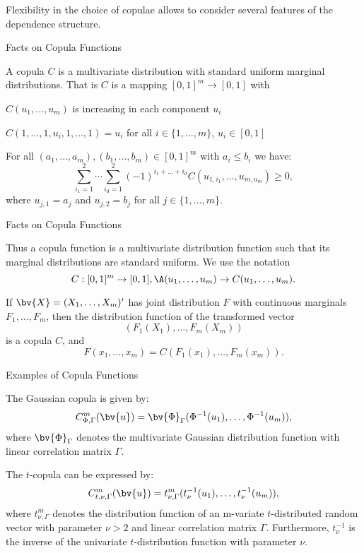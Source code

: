 Flexibility in the choice of copulae allows to consider several
features of the dependence
structure.

{Facts on Copula Functions}

A copula $C$ is a multivariate distribution with standard uniform
marginal distributions. That is $C$ is a mapping $[0,1]^m
\rightarrow [0,1]$ with






	$C(u_1,\ldots,u_m)$ is increasing in each component $u_i$


	$C(1,\ldots,1,u_i,1,\ldots,1)=u_i$ for all
$i\in\{1,\ldots,m\}$, $u_i\in[0,1]$


	For all $(a_1,\ldots,a_m), (b_1,\ldots,b_m)\in[0,1]^m$ with
$a_i\leq b_i$ we have:
$$
\sum_{i_1=1}^2\cdots\sum_{i_d=1}^2(-1)^{i_1+\ldots+i_d}C(u_{1,i_1},\ldots,u_{m,u_m})
\geq 0,
$$
where $u_{j,1}=a_j$ and $u_{j,2}=b_j$ for all $j \in
\{1,\ldots,m\}$.





{Facts on Copula Functions}

Thus a copula function is a multivariate distribution function
such that its marginal distributions are standard uniform. We use
the notation
$$
C:[0,1]^m \rightarrow [0,1], \A (u_1, \ldots, u_m)\rightarrow
C(u_1, \ldots, u_m).
$$

If $\bv{X}=(X_1,\ldots,X_m)'$ has joint distribution $F$ with
continuous marginals $F_1,\ldots,F_m$, then the distribution
function of the transformed vector
$$
(F_1(X_1),\ldots,F_m(X_m))
$$
is a copula $C$, and
$$
F(x_1,\ldots,x_m)=C(F_1(x_1),\ldots,F_m(x_m)).
$$

{Examples of Copula Functions}

The Gaussian copula is given by:
$$
C^m_{\Phi,\Gamma}(\bv{u})=\bv{\Phi}_{\Gamma}(\Phi^{-1}(u_1),\ldots,\Phi^{-1}(u_m)),
$$
where $\bv{\Phi}_{\Gamma}$ denotes the multivariate Gaussian
distribution function with linear correlation matrix $\Gamma$.

The $t$-copula can be expressed by:
$$
C^m_{t,\nu,\Gamma}(\bv{u})=t^m_{\nu,\Gamma}(t_\nu^{-1}(u_1),\ldots,t_{\nu}^{-1}(u_m)),
$$
where $t^m_{\nu,\Gamma}$ denotes the distribution function of an
m-variate $t$-distributed random vector with parameter $\nu>2$ and
linear correlation matrix $\Gamma$. Furthermore, $t^{-1}_\nu$ is
the inverse of  the univariate $t$-distribution function with
parameter $\nu$.

